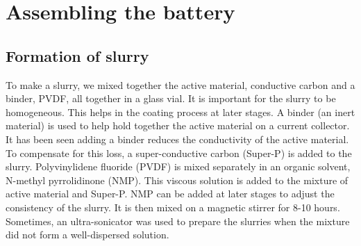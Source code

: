 
\chapter{Assembling the battery} %

\label{chap3} %



\section{Formation of slurry}
To make a slurry, we mixed together the active material, conductive carbon and a binder, PVDF, all together in a glass vial. It is important for the slurry to be homogeneous. This helps in the coating process at  later stages. A binder (an inert material) is used to help hold together the active material on a current collector. It has been seen adding a binder reduces the conductivity of the active material. To compensate for this loss, a super-conductive carbon (Super-P) is added to the slurry. Polyvinylidene fluoride (PVDF) is mixed separately in an organic solvent, N-methyl pyrrolidinone (NMP). This viscous solution is added to the mixture of active material and Super-P. NMP can be added at later stages to adjust the consistency of the slurry. It is then mixed on a magnetic stirrer for 8-10 hours. Sometimes, an ultra-sonicator was used to prepare the slurries when the mixture did not form a well-dispersed solution. 

